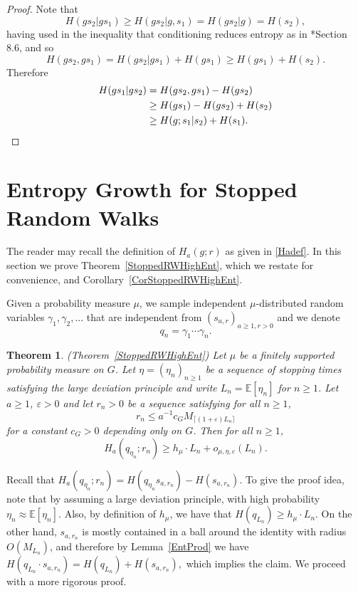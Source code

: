 \documentclass[10pt, english,oneside,reqno]{amsart}
\theoremstyle{plain}
\newtheorem{theorem}{Theorem}[section]
\theoremstyle{remark}
\numberwithin{equation}{section}
\numberwithin{figure}{section}
\newcommand{\eps}{\varepsilon}
\newcommand{\E}{\mathbb{E}}
\begin{document}
\begin{proof}
    Note that $$H(gs_2|gs_1) \geq H(gs_2|g,s_1) = H(gs_2|g)  =  H(s_2),$$ having used in the inequality that conditioning reduces entropy as in \cite{CoverThomasBook}*{Section 8.6}, and so $$H(gs_2,gs_1) = H(gs_2|gs_1) + H(gs_1) \geq H(gs_1) + H(s_2).$$ Therefore 
    \begin{align*}
      H(gs_1|gs_2) &= H(gs_2,gs_1) - H(gs_2) \\ &\geq H(gs_1) - H(gs_2) + H(s_2) \\ &\geq H(g; s_1|s_2) + H(s_1). 
      \qedhere
      \end{align*}
\end{proof}




    
    

    \section{Entropy Growth for Stopped Random Walks}
    \label{EntropyGrowth}


The reader may recall the definition of $H_a(g;r)$ as given in \eqref{Hadef}. In this section we prove Theorem~\ref{StoppedRWHighEnt}, which we restate for convenience, and Corollary~\ref{CorStoppedRWHighEnt}. 

Given a probability measure $\mu$, we sample independent $\mu$-distributed random variables $\gamma_1, \gamma_2, \ldots $ that are independent from $(s_{a,r})_{a \geq 1, r > 0}$ and we denote $$q_n = \gamma_1\cdots \gamma_n.$$

\begin{theorem}\label{2ndStoppedRWHighEnt}(Theorem~\ref{StoppedRWHighEnt}) Let $\mu$ be a finitely supported probability measure on $G$. Let $\eta = (\eta_n)_{n \geq 1}$ be a sequence of stopping times satisfying the large deviation principle and write $L_n = \mathbb{E}[\eta_n]$ for $n\geq 1$. Let $a \geq 1$, $\eps > 0$ and let $r_n > 0$ be a sequence satisfying for all $n\geq 1$, $$r_n \leq a^{-1}c_G M_{\lceil (1 + \eps)L_n \rceil}$$ for a constant $c_G > 0$ depending only on $G$. Then for all $n \geq 1$,
	$$H_a(q_{\eta_{n}} ; r_n) \geq h_{\mu}\cdot L_n + o_{\mu,\eta,\eps}(L_n).$$
\end{theorem}


Recall that $H_a(q_{\eta_n}; r_n) = H(q_{\eta_n}s_{a, r_n}) - H(s_{a, r_n})$. To give the proof idea, note that by assuming a large deviation principle, with high probability $\eta_n \approx \E[\eta_n]$. Also, by definition of $h_{\mu}$, we have that $H(q_{L_n}) \geq h_{\mu} \cdot L_n$. On the other hand,  $s_{a, r_n}$ is mostly contained in a ball around the identity with radius $O(M_{L_n})$, and therefore by Lemma~\ref{EntProd} we have $H(q_{L_n}\cdot s_{a, r_n}) = H(q_{L_n}) + H(s_{a, r_n}),$ which implies the claim. We proceed with a more rigorous proof.
\end{document}
